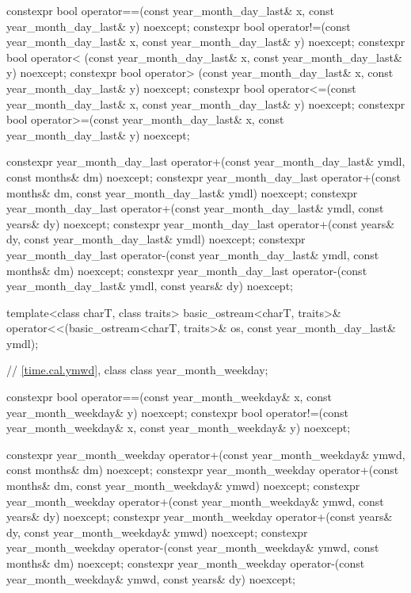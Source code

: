 \begin{codeblock}
{{    constexpr bool operator==(const year_month_day_last& x,
                              const year_month_day_last& y) noexcept;
    constexpr bool operator!=(const year_month_day_last& x,
                              const year_month_day_last& y) noexcept;
    constexpr bool operator< (const year_month_day_last& x,
                              const year_month_day_last& y) noexcept;
    constexpr bool operator> (const year_month_day_last& x,
                              const year_month_day_last& y) noexcept;
    constexpr bool operator<=(const year_month_day_last& x,
                              const year_month_day_last& y) noexcept;
    constexpr bool operator>=(const year_month_day_last& x,
                              const year_month_day_last& y) noexcept;

    constexpr year_month_day_last
      operator+(const year_month_day_last& ymdl, const months& dm) noexcept;
    constexpr year_month_day_last
      operator+(const months& dm, const year_month_day_last& ymdl) noexcept;
    constexpr year_month_day_last
      operator+(const year_month_day_last& ymdl, const years& dy) noexcept;
    constexpr year_month_day_last
      operator+(const years& dy, const year_month_day_last& ymdl) noexcept;
    constexpr year_month_day_last
      operator-(const year_month_day_last& ymdl, const months& dm) noexcept;
    constexpr year_month_day_last
      operator-(const year_month_day_last& ymdl, const years& dy) noexcept;

    template<class charT, class traits>
      basic_ostream<charT, traits>&
        operator<<(basic_ostream<charT, traits>& os, const year_month_day_last& ymdl);

    // \ref{time.cal.ymwd}, class 
    class year_month_weekday;

    constexpr bool operator==(const year_month_weekday& x,
                              const year_month_weekday& y) noexcept;
    constexpr bool operator!=(const year_month_weekday& x,
                              const year_month_weekday& y) noexcept;

    constexpr year_month_weekday
      operator+(const year_month_weekday& ymwd, const months& dm) noexcept;
    constexpr year_month_weekday
      operator+(const months& dm, const year_month_weekday& ymwd) noexcept;
    constexpr year_month_weekday
      operator+(const year_month_weekday& ymwd, const years& dy) noexcept;
    constexpr year_month_weekday
      operator+(const years& dy, const year_month_weekday& ymwd) noexcept;
    constexpr year_month_weekday
      operator-(const year_month_weekday& ymwd, const months& dm) noexcept;
    constexpr year_month_weekday
      operator-(const year_month_weekday& ymwd, const years& dy) noexcept;

}}
\end{codeblock}
